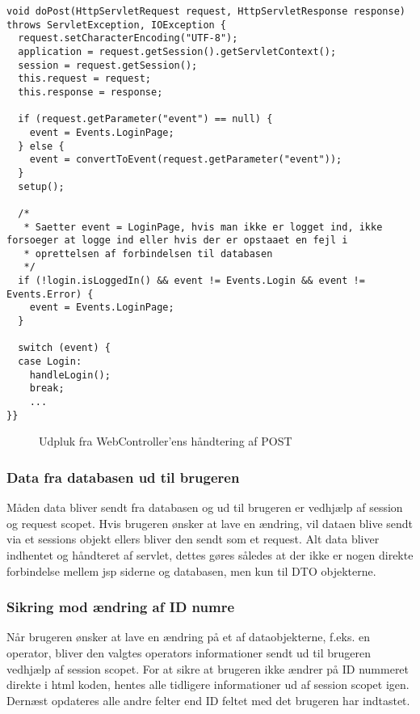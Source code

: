 \documentclass[a4paper]{article}
\newenvironment{changemargin}[2]{%
\begin{list}{}{%
\setlength{\topsep}{0pt}%
\setlength{\leftmargin}{#1}%
\setlength{\rightmargin}{#2}%
\setlength{\listparindent}{\parindent}%
\setlength{\itemindent}{\parindent}%
\setlength{\parsep}{\parskip}%
}%
\item[]}{\end{list}}
\begin{document}
\begin{changemargin}{-1.5cm}{-1.5c}
\begin{lstlisting}
void doPost(HttpServletRequest request, HttpServletResponse response) throws ServletException, IOException {
  request.setCharacterEncoding("UTF-8");
  application = request.getSession().getServletContext();
  session = request.getSession();
  this.request = request;
  this.response = response;

  if (request.getParameter("event") == null) {
    event = Events.LoginPage;
  } else {
    event = convertToEvent(request.getParameter("event"));
  }
  setup();

  /*
   * Saetter event = LoginPage, hvis man ikke er logget ind, ikke forsoeger at logge ind eller hvis der er opstaaet en fejl i
   * oprettelsen af forbindelsen til databasen
   */
  if (!login.isLoggedIn() && event != Events.Login && event != Events.Error) {
    event = Events.LoginPage;
  }

  switch (event) {
  case Login:
    handleLogin();
    break;
    ...
}}
\end{lstlisting}
\end{changemargin}
\begin{figure}[h!]
  \caption{Udpluk fra WebController'ens håndtering af POST}
\end{figure}



\subsubsection{Data fra databasen ud til brugeren} %

Måden data bliver sendt fra databasen og ud til brugeren er vedhjælp af session og request scopet. Hvis brugeren ønsker at lave en ændring, vil dataen blive sendt via et sessions objekt ellers bliver den sendt som et request.  Alt data bliver indhentet og håndteret af servlet, dettes gøres således at der ikke er nogen direkte forbindelse mellem jsp siderne og databasen, men kun til DTO objekterne.   


\subsubsection{Sikring mod ændring af ID numre} %

Når brugeren ønsker at lave en ændring på et af dataobjekterne, f.eks. en operator, bliver den valgtes operators informationer sendt ud til brugeren vedhjælp af session scopet. For at sikre at brugeren ikke ændrer på ID nummeret direkte i html koden, hentes alle tidligere informationer ud af session scopet igen.  Dernæst opdateres alle andre felter end ID feltet med det brugeren har indtastet.
\end{document}
